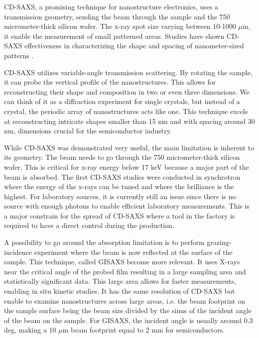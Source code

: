 \medskip

CD-SAXS, a promising technique for nanostructure electronics, uses a transmission geometry, sending the beam through the sample and the 750 micrometer-thick silicon wafer. The x-ray spot size varying between 10-1000 $\mu$m, it enable the measurement of small patterned areas. 
Studies have shown CD-SAXS effectiveness in characterizing the shape and spacing of nanometer-sized patterns \cite{sunday_2015}.

\medskip
CD-SAXS utilizes variable-angle transmission scattering. By rotating the sample, it can probe the vertical profile of the nanostructures. This allows 
for reconstructing their shape and composition in two or even three dimensions.
We can think of it as a diffraction experiment for single crystals, but instead of a crystal, the 
periodic array of nanostructures acts like one. This technique excels at reconstructing 
intricate shapes smaller than 15 nm and with spacing around 30 nm, dimensions crucial for 
the semiconductor industry. \cite{first_cdsaxs_article}

\medskip
While CD-SAXS was demonstrated very useful, the main limitation is inherent to its geometry. The beam needs to go through the 750 micrometer-thick silicon wafer.
This is critical for x-ray energy below 17 keV because a major part of the beam is absorbed. The first CD-SAXS studies were conducted in synchrotron where the energy
of the x-rays can be tuned and where the brilliance is the highest. For laboratory sources, it is currently still an issue since there is no source with enough photons to enable
efficient laboratory measurements. This is a major constrain for the spread of CD-SAXS where a tool in the factory is required to have a direct control during the production. 

\medskip
A possibility to go around the absorption limitation is to perform grazing-incidence experiment where the beam is now reflected at the surface of the sample. This technique, 
called GISAXS become more relevant. It uses X-rays near the critical angle of the probed film resulting in a large sampling area and statistically significant data. This large area allows for faster measurements, enabling in situ kinetic studies.
It has the same resolution of CD-SAXS but enable to examine nanostructures across large areas, i.e. the beam footprint on the sample surface 
being the beam size divided by the sinus of the incident angle of the beam on the sample. For GISAXS, the incident angle is usually around 0.3 deg, making a 10 $\mu$m beam footprint equal to 2 mm for semiconductors. 

